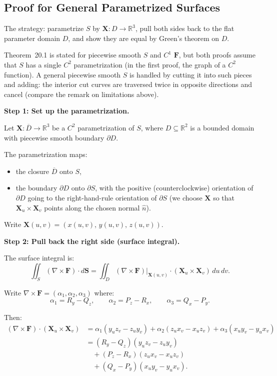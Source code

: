 \documentclass[11pt]{report}
\newcommand{\R}{\mathbb{R}}
\begin{document}
\subsection{Proof for General Parametrized Surfaces}

The strategy: parametrize $S$ by $\mathbf{X}: D \to \R^3$, pull both sides back to the flat parameter domain $D$, and show they are equal by Green's theorem on $D$.

Theorem~20.1 is stated for piecewise smooth $S$ and $C^1$ $\mathbf{F}$, but both proofs assume that $S$ has a single $C^2$ parametrization (in the first proof, the graph of a $C^2$ function). A general piecewise smooth $S$ is handled by cutting it into such pieces and adding: the interior cut curves are traversed twice in opposite directions and cancel (compare the remark on limitations above).

\textbf{Step 1: Set up the parametrization.}

Let $\mathbf{X}: \overline{D} \to \R^3$ be a $C^2$ parametrization of $S$, where $D \subseteq \R^2$ is a bounded domain with piecewise smooth boundary $\partial D$.

The parametrization maps:
\begin{itemize}
    \item the closure $\overline{D}$ onto $S$,
    \item the boundary $\partial D$ onto $\partial S$, with the positive (counterclockwise) orientation of $\partial D$ going to the right-hand-rule orientation of $\partial S$ (we choose $\mathbf{X}$ so that $\mathbf{X}_u \times \mathbf{X}_v$ points along the chosen normal $\hat{n}$).
\end{itemize}

Write $\mathbf{X}(u,v) = (x(u,v), \, y(u,v), \, z(u,v))$.

\textbf{Step 2: Pull back the right side (surface integral).}

The surface integral is:
\[
\iint_S (\nabla \times \mathbf{F}) \cdot d\mathbf{S} = \iint_D (\nabla \times \mathbf{F})\big|_{\mathbf{X}(u,v)} \cdot (\mathbf{X}_u \times \mathbf{X}_v) \, du \, dv.
\]

Write $\nabla \times \mathbf{F} = (\alpha_1, \alpha_2, \alpha_3)$ where:
\[
\alpha_1 = R_y - Q_z, \qquad \alpha_2 = P_z - R_x, \qquad \alpha_3 = Q_x - P_y.
\]

Then:
\begin{align*}
(\nabla \times \mathbf{F}) \cdot (\mathbf{X}_u \times \mathbf{X}_v) &= \alpha_1(y_u z_v - z_u y_v) + \alpha_2(z_u x_v - x_u z_v) + \alpha_3(x_u y_v - y_u x_v) \\
&= (R_y - Q_z)(y_u z_v - z_u y_v) \\
&\quad + (P_z - R_x)(z_u x_v - x_u z_v) \\
&\quad + (Q_x - P_y)(x_u y_v - y_u x_v). \tag{RHS}
\end{align*}
\end{document}
